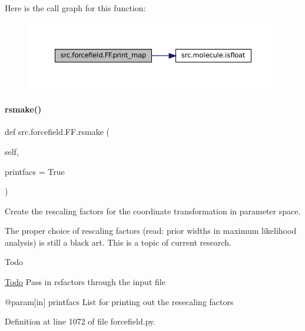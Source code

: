 Here is the call graph for this function\+:
\nopagebreak
\begin{figure}[H]
\begin{center}
\leavevmode
\includegraphics[width=350pt]{classsrc_1_1forcefield_1_1FF_a89b99d1b614774279870e1912f1edd3d_cgraph}
\end{center}
\end{figure}
\mbox{\label{classsrc_1_1forcefield_1_1FF_a4524aae9e3644c578766a36f220ef076}} 
\paragraph{\texorpdfstring{rsmake()}{rsmake()}}
{\footnotesize\ttfamily def src.\+forcefield.\+F\+F.\+rsmake (\begin{DoxyParamCaption}\item[{}]{self,  }\item[{}]{printfacs = {\ttfamily True} }\end{DoxyParamCaption})}



Create the rescaling factors for the coordinate transformation in parameter space. 

The proper choice of rescaling factors (read\+: prior widths in maximum likelihood analysis) is still a black art. This is a topic of current research.

\begin{DoxyRefDesc}{Todo}
\item[\hyperlink{todo__todo000006}{Todo}]Pass in rsfactors through the input file\end{DoxyRefDesc}
\begin{DoxyVerb}     @param[in] printfacs List for printing out the resecaling factors\end{DoxyVerb}
 

Definition at line 1072 of file forcefield.\+py.

